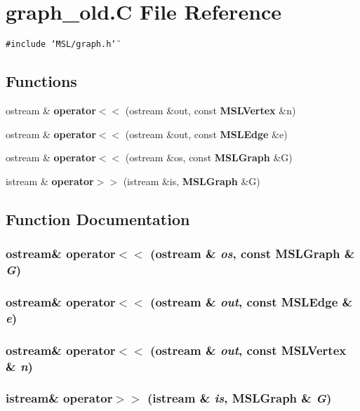 \section{graph\_\-old.C File Reference}
\label{graph__old_8C}
{\tt \#include \char`\"{}MSL/graph.h\char`\"{}}\par
\subsection*{Functions}
\begin{CompactItemize}
\item 
ostream \& {\bf operator$<$$<$} (ostream \&out, const {\bf MSLVertex} \&n)
\item 
ostream \& {\bf operator$<$$<$} (ostream \&out, const {\bf MSLEdge} \&e)
\item 
ostream \& {\bf operator$<$$<$} (ostream \&os, const {\bf MSLGraph} \&G)
\item 
istream \& {\bf operator$>$$>$} (istream \&is, {\bf MSLGraph} \&G)
\end{CompactItemize}


\subsection{Function Documentation}
\subsubsection{\setlength{\rightskip}{0pt plus 5cm}ostream\& operator$<$$<$ (ostream \& {\em os}, const {\bf MSLGraph} \& {\em G})}\label{graph__old_8C_a2}


\subsubsection{\setlength{\rightskip}{0pt plus 5cm}ostream\& operator$<$$<$ (ostream \& {\em out}, const {\bf MSLEdge} \& {\em e})}\label{graph__old_8C_a1}


\subsubsection{\setlength{\rightskip}{0pt plus 5cm}ostream\& operator$<$$<$ (ostream \& {\em out}, const {\bf MSLVertex} \& {\em n})}\label{graph__old_8C_a0}


\subsubsection{\setlength{\rightskip}{0pt plus 5cm}istream\& operator$>$$>$ (istream \& {\em is}, {\bf MSLGraph} \& {\em G})}\label{graph__old_8C_a3}


